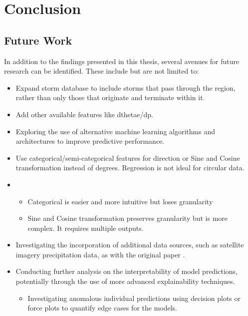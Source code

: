 \chapter{Conclusion}
\label{ch:con}

\section{Future Work}
In addition to the findings presented in this thesis, several avenues for future research can be identified. These include but are not limited to:

\begin{itemize}
    \item Expand storm database to include storms that pass through the region, rather than only those that originate and terminate within it.
    \item Add other available features like dthetae/dp.
    \item Exploring the use of alternative machine learning algorithms and architectures to improve predictive performance.
    \item Use categorical/semi-categorical features for direction or Sine and Cosine transformation instead of degrees. Regression is not ideal for circular data.
    \item \begin{itemize}
        \item Categorical is easier and more intuitive but loses granularity
        \item Sine and Cosine transformation preserves granularity but is more complex. It requires multiple outputs.
    \end{itemize}
    \item Investigating the incorporation of additional data sources, such as satellite imagery precipitation data, as with the original paper \citep{Hill2023}.
    \item Conducting further analysis on the interpretability of model predictions, potentially through the use of more advanced explainability techniques.
    \begin{itemize}
        \item Investigating anomalous individual predictions using decision plots or force plots to quantify edge cases for the models.
    \end{itemize}
\end{itemize}